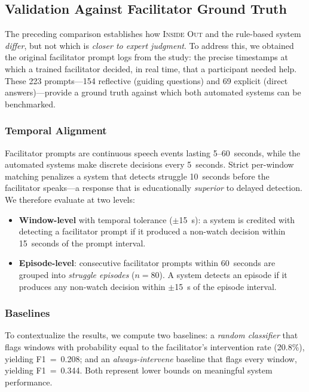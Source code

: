 \subsection{Validation Against Facilitator Ground Truth}
\label{sec:facilitator_benchmark}

The preceding comparison establishes how \textsc{Inside Out} and the rule-based system \emph{differ}, but not which is \emph{closer to expert judgment}. To address this, we obtained the original facilitator prompt logs from the study: the precise timestamps at which a trained facilitator decided, in real time, that a participant needed help. These 223 prompts---154 reflective (guiding questions) and 69 explicit (direct answers)---provide a ground truth against which both automated systems can be benchmarked.

\subsubsection{Temporal Alignment}

Facilitator prompts are continuous speech events lasting 5--60~seconds, while the automated systems make discrete decisions every 5~seconds. Strict per-window matching penalizes a system that detects struggle 10~seconds before the facilitator speaks---a response that is educationally \emph{superior} to delayed detection. We therefore evaluate at two levels:

\begin{itemize}
    \item \textbf{Window-level} with temporal tolerance ($\pm$15~s): a system is credited with detecting a facilitator prompt if it produced a non-watch decision within 15~seconds of the prompt interval.
    \item \textbf{Episode-level}: consecutive facilitator prompts within 60~seconds are grouped into \emph{struggle episodes} ($n = 80$). A system detects an episode if it produces any non-watch decision within $\pm$15~s of the episode interval.
\end{itemize}

\subsubsection{Baselines}

To contextualize the results, we compute two baselines: a \emph{random classifier} that flags windows with probability equal to the facilitator's intervention rate (20.8\%), yielding F1~=~0.208; and an \emph{always-intervene} baseline that flags every window, yielding F1~=~0.344. Both represent lower bounds on meaningful system performance.

